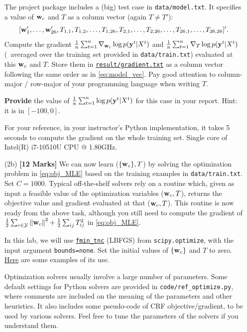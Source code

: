 \documentclass[11pt]{report}
\begin{document}
\begin{itemize}
		The project package includes a (big) test case in \verb#data/model.txt#.
		It specifies a value of $\mathbf{\boldsymbol{w}}_c$ and $T$ as a column vector (again $T \neq T'$):
		\begin{align}
			\label{eq:model_vec}
			[\mathbf{\boldsymbol{w}}'_1, \ldots, \mathbf{\boldsymbol{w}}'_{26}, T_{1,1}, T_{1,2}, \ldots, T_{1, 26}, T_{2,1}, \ldots, T_{2, 26}, \ldots, T_{26,1}, \ldots, T_{26, 26}]'.
		\end{align}
		Compute the gradient $\frac{1}{n} \sum_{t=1}^n {\nabla}_{\mathbf{\boldsymbol{w}}_c} \log p(\mathbf{\boldsymbol{y}}^t | X^t)$ and
		$\frac{1}{n} \sum_{t=1}^n {\nabla}_{T} \log p(\mathbf{\boldsymbol{y}}^t | X^t)$
		(\ie\ averaged over the training set provided in \verb#data/train.txt#) evaluated at this $\mathbf{\boldsymbol{w}}_c$ and $T$.
		Store them in \underline{\texttt{result/gradient.txt}} as a column vector following the same order as in \eqref{eq:model_vec}.
		Pay good attention to column-major / row-major of your programming language when writing $T$.
		
		{\bf Provide} the value of $\frac{1}{n} \sum_{t=1}^n \log p(\mathbf{\boldsymbol{y}}^t | X^t)$ for this case in your report.
		Hint: it is in $[-100,0]$.
		
		
		For your reference,
		in your instructor's Python implementation,
		it takes 5 seconds to compute the gradient on the whole training set.
		Single core of Intel(R) i7-10510U CPU @ 1.80GHz.
		
		
		\item[(2b)] {\bf [12 Marks]} We can now learn ($\{\mathbf{\boldsymbol{w}}_c\}, T$) by solving the optimization problem in \eqref{eq:obj_MLE} based on the training examples in \verb#data/train.txt#.
		Set $C = 1000$.
		Typical off-the-shelf solvers rely on a routine which, given as input a feasible value of the optimization variables ($\mathbf{\boldsymbol{w}}_c, T$), returns the objective value and gradient evaluated at that ($\mathbf{\boldsymbol{w}}_c, T$). This routine is now ready from the above task,
		although you still need to compute the gradient of $\frac{1}{2} \sum_{c \in \mathcal{Y}} \left\|\mathbf{\boldsymbol{w}}_c\right\|^2 + \frac{1}{2} \sum_{ij} T^2_{ij}$ in \eqref{eq:obj_MLE}.
		
		In this lab, we will use \href{https://docs.scipy.org/doc/scipy/reference/generated/scipy.optimize.fmin_tnc.html}{\texttt{fmin\_tnc}} (LBFGS) from \verb#scipy.optimize#, with the input argument \verb#bounds=none#.	
		Set the initial values of $\{\mathbf{\boldsymbol{w}}_c\}$ and $T$ to zero.
		\href{https://www.programcreek.com/python/example/114546/scipy.optimize.fmin_tnc}{Here} are some examples of its use.
		
		Optimization solvers usually involve a large number of parameters.
		Some default settings for Python solvers are provided in \verb#code/ref_optimize.py#,
		where comments are included on the meaning of the parameters and other heuristics.
		It also includes some pseudo-code of CRF objective/gradient,
		to be used by various solvers.
		Feel free to tune the parameters of the solvers if you understand them.
		

\end{itemize}
\end{document}
